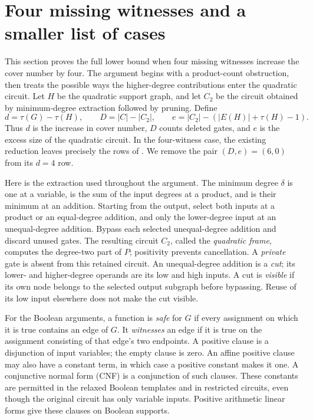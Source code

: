 \section{Four missing witnesses and a smaller list of cases}\label{sec:four}
This section proves the full lower bound when four missing witnesses increase the cover number by four. The argument begins with a product-count obstruction, then treats the possible ways the higher-degree contributions enter the quadratic circuit. Let $H$ be the quadratic support graph, and let $C_2$ be the circuit obtained by minimum-degree extraction followed by pruning. Define
\[
 d=\tau(G)-\tau(H),\qquad D=|C|-|C_2|,\qquad
 e=|C_2|-(|E(H)|+\tau(H)-1).
\]
Thus $d$ is the increase in cover number, $D$ counts deleted gates, and $e$ is the excess size of the quadratic circuit. In the four-witness case, the existing reduction leaves precisely the rows of \citet[Corollary~5.34]{Companion}. We remove the pair $(D,e)=(6,0)$ from its $d=4$ row.

Here is the extraction used throughout the argument. The minimum degree
$\delta$ is one at a variable, is the sum of the input degrees at a
product, and is their minimum at an addition. Starting from the output,
select both inputs at a product or an equal-degree addition, and only the
lower-degree input at an unequal-degree addition. Bypass each selected
unequal-degree addition and discard unused gates. The resulting circuit
$C_2$, called the \emph{quadratic frame}, computes the degree-two part of
$P$; positivity prevents cancellation. A \emph{private} gate is absent
from this retained circuit. An unequal-degree addition is a
\emph{cut}; its lower- and higher-degree operands are its low and high
inputs. A cut is \emph{visible} if its own node belongs to the selected
output subgraph before bypassing. Reuse of its low input elsewhere does
not make the cut visible.

For the Boolean arguments, a function is \emph{safe} for $G$ if every
assignment on which it is true contains an edge of $G$. It
\emph{witnesses} an edge if it is true on the assignment consisting of
that edge's two endpoints. A positive clause is a disjunction of input
variables; the empty clause is zero. An affine positive clause may also
have a constant term, in which case a positive constant makes it one.
A conjunctive normal form (CNF) is a conjunction of such clauses.
These constants are permitted in the relaxed Boolean templates and in
restricted circuits, even though the original circuit has only variable
inputs. Positive arithmetic linear forms give these clauses on Boolean
supports.



